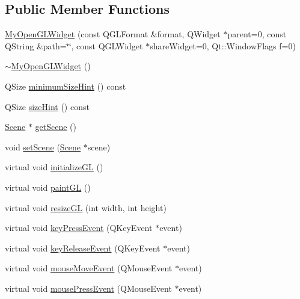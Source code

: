 \subsection*{Public Member Functions}
\begin{DoxyCompactItemize}
\item 
\hyperlink{class_my_open_g_l_widget_a78f2284f348e8b482875ccdfbf704b34}{My\+Open\+G\+L\+Widget} (const Q\+G\+L\+Format \&format, Q\+Widget $\ast$parent=0, const Q\+String \&path=\char`\"{}\char`\"{}, const Q\+G\+L\+Widget $\ast$share\+Widget=0, Qt\+::\+Window\+Flags f=0)
\item 
\hyperlink{class_my_open_g_l_widget_aa9bdb4eb867d9e0bbfab210732fa5883}{$\sim$\+My\+Open\+G\+L\+Widget} ()
\item 
Q\+Size \hyperlink{class_my_open_g_l_widget_a4a037578f8e21a015e7b2915992fbe5d}{minimum\+Size\+Hint} () const 
\item 
Q\+Size \hyperlink{class_my_open_g_l_widget_abacca5d710f6a81b5edfd164f0148ed6}{size\+Hint} () const 
\item 
\hyperlink{class_scene}{Scene} $\ast$ \hyperlink{class_my_open_g_l_widget_ab25f238721b8e1cba36c2a0350ac57ba}{get\+Scene} ()
\item 
void \hyperlink{class_my_open_g_l_widget_aaac5737e9ce05a94006aa92afed5d403}{set\+Scene} (\hyperlink{class_scene}{Scene} $\ast$scene)
\item 
virtual void \hyperlink{class_my_open_g_l_widget_a98597f5669cec1c90f36c1d38569afc5}{initialize\+G\+L} ()
\item 
virtual void \hyperlink{class_my_open_g_l_widget_af7babfe769e968c317e646c4387b357d}{paint\+G\+L} ()
\item 
virtual void \hyperlink{class_my_open_g_l_widget_a51847d078dbd11fb99335abbc5eaf4fc}{resize\+G\+L} (int width, int height)
\item 
virtual void \hyperlink{class_my_open_g_l_widget_a87a479700547c066721b4b3532b040a2}{key\+Press\+Event} (Q\+Key\+Event $\ast$event)
\item 
virtual void \hyperlink{class_my_open_g_l_widget_a57e054ac1c21ed8585ca57b151ec6b38}{key\+Release\+Event} (Q\+Key\+Event $\ast$event)
\item 
virtual void \hyperlink{class_my_open_g_l_widget_a27abe02c04240317cf42c1cec1ac7e25}{mouse\+Move\+Event} (Q\+Mouse\+Event $\ast$event)
\item 
virtual void \hyperlink{class_my_open_g_l_widget_a6a2e229f91bb75775bb539c85bb696ef}{mouse\+Press\+Event} (Q\+Mouse\+Event $\ast$event)
\item 

\end{DoxyCompactItemize}

